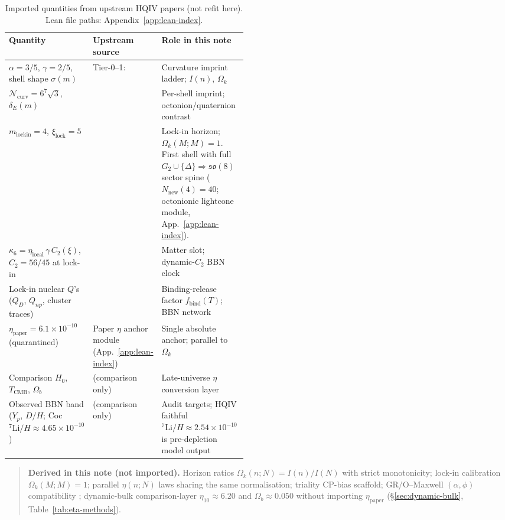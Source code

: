 \documentclass[11pt]{amsart}
\newenvironment{summarybox}{%
  \medskip\begin{quote}\small
}{%
  \end{quote}\medskip
}
\begin{document}
\begin{table}[ht]
\centering
\caption{Imported quantities from upstream HQIV papers (not refit here).
Lean file paths: Appendix~\ref{app:lean-index}.}
\label{tab:imported-spine}
\footnotesize
\begin{tabularx}{\linewidth}{@{}>{\raggedright\arraybackslash}p{0.19\linewidth}>{\raggedright\arraybackslash}p{0.28\linewidth}X@{}}
\toprule
Quantity & Upstream source & Role in this note \\
\midrule
$\alpha=3/5$, $\gamma=2/5$, shell shape $\sigma(m)$ &
  Tier-0--1: \cite{hqiv-so8-paper,hqiv-3d-growth-paper,hqiv-oct-action-paper} &
  Curvature imprint ladder; $I(n)$, $\Omega_k$ \\
$\mathcal{N}_{\mathrm{curv}}=6^7\sqrt{3}$, $\delta_E(m)$ &
  \cite{hqiv-so8-paper,hqiv-lightcone-paper} &
  Per-shell imprint; octonion/quaternion contrast \\
$m_{\mathrm{lockin}}=4$, $\xi_{\mathrm{lock}}=5$ &
  \cite{hqiv-kirchhoff-paper,hqiv-tuft-sm-lagrangian-paper,hqiv-so8-paper} &
  Lock-in horizon; $\Omega_k(M;M)=1$. First shell with full
  $G_2\cup\{\Delta\}\Rightarrow\mathfrak{so}(8)$ sector spine
  ($N_{\mathrm{new}}(4)=40$; octonionic lightcone module,
  App.~\ref{app:lean-index}). \\
$\kappa_6=\eta_{\mathrm{local}}\,\gamma\,C_2(\xi)$, $C_2=56/45$ at lock-in &
  \cite{hqiv-tuft-sm-lagrangian-paper} &
  Matter slot; dynamic-$C_2$ BBN clock \\
Lock-in nuclear $Q$'s ($Q_D$, $Q_{np}$, cluster traces) &
  \cite{hqiv-nucleon-binding-paper,hqiv-tuft-sm-lagrangian-paper} &
  Binding-release factor $f_{\mathrm{bind}}(T)$; BBN network \\
$\eta_{\mathrm{paper}}=6.1\times 10^{-10}$ (quarantined) &
  Paper $\eta$ anchor module (App.~\ref{app:lean-index}) &
  Single absolute anchor; parallel to $\Omega_k$ \\
Comparison $H_0$, $T_{\mathrm{CMB}}$, $\Omega_b$ &
  \cite{planck2018cosmo,pdg2024} (comparison only) &
  Late-universe $\eta$ conversion layer \\
Observed BBN band ($Y_p$, $D/H$; Coc $^7\mathrm{Li}/H\approx 4.65\times 10^{-10}$) &
  \cite{coc2015} (comparison only) &
  Audit targets; HQIV faithful $^7\mathrm{Li}/H\approx 2.54\times 10^{-10}$
  is pre-depletion model output \\
\bottomrule
\end{tabularx}
\end{table}

\begin{summarybox}
\noindent\textbf{Derived in this note (not imported).}
Horizon ratios $\Omega_k(n;N)=I(n)/I(N)$ with strict monotonicity;
lock-in calibration $\Omega_k(M;M)=1$; parallel $\eta(n;N)$ laws sharing
the same normalisation; triality CP-bias scaffold; GR/O--Maxwell $(\alpha,\phi)$
compatibility \cite{hqiv-oct-action-paper}; dynamic-bulk comparison-layer
$\eta_{10}\approx 6.20$ and $\Omega_b\approx 0.050$ without importing
$\eta_{\mathrm{paper}}$ (\S\ref{sec:dynamic-bulk}, Table~\ref{tab:eta-methods}).
\end{summarybox}
\end{document}
